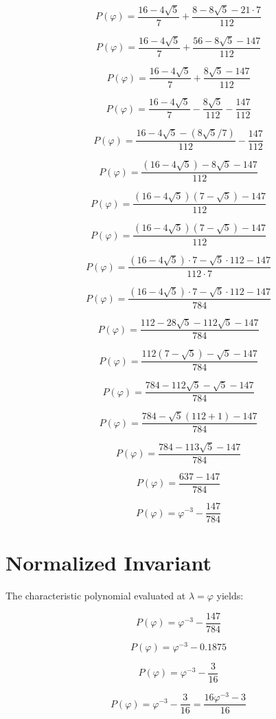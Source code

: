 \documentclass{article}
\begin{document}
\[
P(\varphi) = \frac{16 - 4\sqrt{5}}{7} + \frac{8 - 8\sqrt{5} - 21 \cdot 7}{112}
\]

\[
P(\varphi) = \frac{16 - 4\sqrt{5}}{7} + \frac{56 - 8\sqrt{5} - 147}{112}
\]

\[
P(\varphi) = \frac{16 - 4\sqrt{5}}{7} + \frac{8\sqrt{5} - 147}{112}
\]

\[
P(\varphi) = \frac{16 - 4\sqrt{5}}{7} - \frac{8\sqrt{5}}{112} - \frac{147}{112}
\]

\[
P(\varphi) = \frac{16 - 4\sqrt{5} - (8\sqrt{5}/7)}{112} - \frac{147}{112}
\]

\[
P(\varphi) = \frac{(16 - 4\sqrt{5}) - 8\sqrt{5} - 147}{112}
\]

\[
P(\varphi) = \frac{(16 - 4\sqrt{5})(7 - \sqrt{5}) - 147}{112}
\]

\[
P(\varphi) = \frac{(16 - 4\sqrt{5})(7 - \sqrt{5}) - 147}{112}
\]

\[
P(\varphi) = \frac{(16 - 4\sqrt{5}) \cdot 7 - \sqrt{5} \cdot 112 - 147}{112 \cdot 7}
\]

\[
P(\varphi) = \frac{(16 - 4\sqrt{5}) \cdot 7 - \sqrt{5} \cdot 112 - 147}{784}
\]

\[
P(\varphi) = \frac{112 - 28\sqrt{5} - 112\sqrt{5} - 147}{784}
\]

\[
P(\varphi) = \frac{112(7 - \sqrt{5}) - \sqrt{5} - 147}{784}
\]

\[
P(\varphi) = \frac{784 - 112\sqrt{5} - \sqrt{5} - 147}{784}
\]

\[
P(\varphi) = \frac{784 - \sqrt{5}(112 + 1) - 147}{784}
\]

\[
P(\varphi) = \frac{784 - 113\sqrt{5} - 147}{784}
\]

\[
P(\varphi) = \frac{637 - 147}{784}
\]

\[
P(\varphi) = \varphi^{-3} - \frac{147}{784}
\]

\section{Normalized Invariant}

The characteristic polynomial evaluated at $\lambda = \varphi$ yields:

\[
P(\varphi) = \varphi^{-3} - \frac{147}{784}
\]

\[
P(\varphi) = \varphi^{-3} - 0.1875
\]

\[
P(\varphi) = \varphi^{-3} - \frac{3}{16}
\]

\[
P(\varphi) = \varphi^{-3} - \frac{3}{16} = \frac{16\varphi^{-3} - 3}{16}
\]
\end{document}
